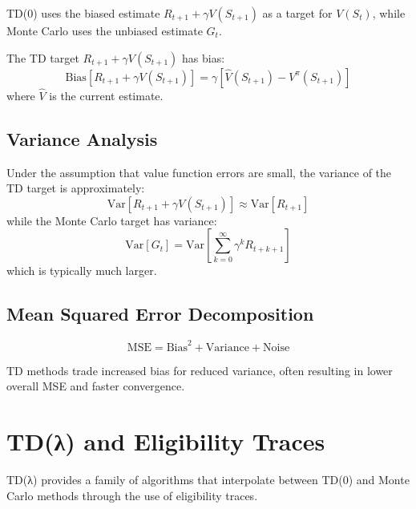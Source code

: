 TD(0) uses the biased estimate $R_{t+1} + \gamma V(S_{t+1})$ as a target for $V(S_t)$, while Monte Carlo uses the unbiased estimate $G_t$.

\begin{theorem}
The TD target $R_{t+1} + \gamma V(S_{t+1})$ has bias:
\begin{equation}
\text{Bias}[R_{t+1} + \gamma V(S_{t+1})] = \gamma[\hat{V}(S_{t+1}) - V^\pi(S_{t+1})]
\end{equation}
where $\hat{V}$ is the current estimate.
\end{theorem}

\subsection{Variance Analysis}

\begin{theorem}
Under the assumption that value function errors are small, the variance of the TD target is approximately:
\begin{equation}
\text{Var}[R_{t+1} + \gamma V(S_{t+1})] \approx \text{Var}[R_{t+1}]
\end{equation}
while the Monte Carlo target has variance:
\begin{equation}
\text{Var}[G_t] = \text{Var}\left[\sum_{k=0}^\infty \gamma^k R_{t+k+1}\right]
\end{equation}
which is typically much larger.
\end{theorem}

\subsection{Mean Squared Error Decomposition}

\begin{equation}
\text{MSE} = \text{Bias}^2 + \text{Variance} + \text{Noise}
\end{equation}

TD methods trade increased bias for reduced variance, often resulting in lower overall MSE and faster convergence.

\section{TD(λ) and Eligibility Traces}

TD(λ) provides a family of algorithms that interpolate between TD(0) and Monte Carlo methods through the use of eligibility traces.

